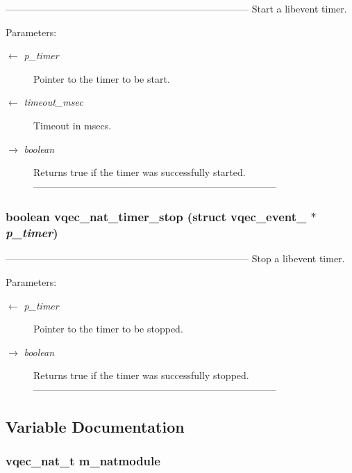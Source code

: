 --------------------------------------------------------------------------- Start a libevent timer.

\begin{Desc}
\item[Parameters:]
\begin{description}
\item[\mbox{$\leftarrow$} {\em p\_\-timer}]Pointer to the timer to be start. \item[\mbox{$\leftarrow$} {\em timeout\_\-msec}]Timeout in msecs. \item[\mbox{$\rightarrow$} {\em boolean}]Returns true if the timer was successfully started. --------------------------------------------------------------------------- \end{description}
\end{Desc}
\subsubsection{\setlength{\rightskip}{0pt plus 5cm}boolean vqec\_\-nat\_\-timer\_\-stop (struct vqec\_\-event\_\- $\ast$ {\em p\_\-timer})}\label{vqec__nat__api_8c_50d1558966f5b43d5a690426f1b99507}


--------------------------------------------------------------------------- Stop a libevent timer.

\begin{Desc}
\item[Parameters:]
\begin{description}
\item[\mbox{$\leftarrow$} {\em p\_\-timer}]Pointer to the timer to be stopped. \item[\mbox{$\rightarrow$} {\em boolean}]Returns true if the timer was successfully stopped. --------------------------------------------------------------------------- \end{description}
\end{Desc}


\subsection{Variable Documentation}
\subsubsection{\setlength{\rightskip}{0pt plus 5cm}\bf{vqec\_\-nat\_\-t} \bf{m\_\-natmodule}\hspace{0.3cm}{\tt  [static]}}\label{vqec__nat__api_8c_35eb7bb1ae64c55bac1ae98ae8d9644a}



